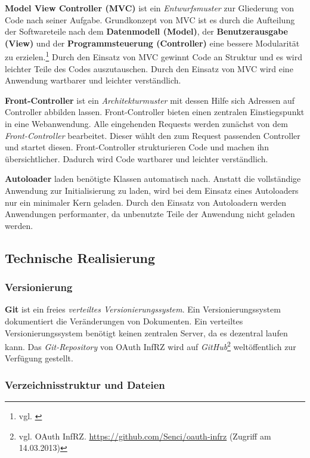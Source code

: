 \documentclass[12pt,a4paper,pointednumbers,abstracton]{scrartcl}
\begin{document}
\textbf{Model View Controller (MVC)} ist ein \emph{Entwurfsmuster} zur Gliederung von Code nach seiner Aufgabe.
Grundkonzept von MVC ist es durch die Aufteilung der Softwareteile nach dem \textbf{Datenmodell (Model)}, der \textbf{Benutzerausgabe (View)} und der \textbf{Programmsteuerung (Controller)} eine bessere Modularität zu erzielen.\footnote{vgl. \cite[Section 6.3]{Som10}}
Durch den Einsatz von MVC gewinnt Code an Struktur und es wird leichter Teile des Codes auszutauschen.
Durch den Einsatz von MVC wird eine Anwendung wartbarer und leichter verständlich.

\textbf{Front-Controller} ist ein \emph{Architekturmuster} mit dessen Hilfe sich Adressen auf Controller abbilden lassen.
Front-Controller bieten einen zentralen Einstiegspunkt in eine Webanwendung.
Alle eingehenden Requests werden zunächst von dem \emph{Front-Controller} bearbeitet.
Dieser wählt den zum Request passenden Controller und startet diesen.
Front-Controller strukturieren Code und machen ihn übersichtlicher.
Dadurch wird Code wartbarer und leichter verständlich.

\textbf{Autoloader} laden benötigte Klassen automatisch nach.
Anstatt die vollständige Anwendung zur Initialisierung zu laden, wird bei dem Einsatz eines Autoloaders nur ein minimaler Kern geladen.
Durch den Einsatz von Autoloadern werden Anwendungen performanter, da unbenutzte Teile der Anwendung nicht geladen werden.

\subsection{Technische Realisierung}

\subsubsection{Versionierung}

\textbf{Git} ist ein freies \emph{verteiltes Versionierungssystem}.
Ein Versionierungssystem dokumentiert die Veränderungen von Dokumenten.
Ein verteiltes Versionierungssystem benötigt keinen zentralen Server, da es dezentral laufen kann.
Das \emph{Git-Repository} von OAuth InfRZ wird auf \emph{GitHub}\footnote{vgl. OAuth InfRZ. \url{https://github.com/Senci/oauth-infrz} (Zugriff am 14.03.2013)} weltöffentlich zur Verfügung gestellt.

\subsubsection{Verzeichnisstruktur und Dateien}
\end{document}
